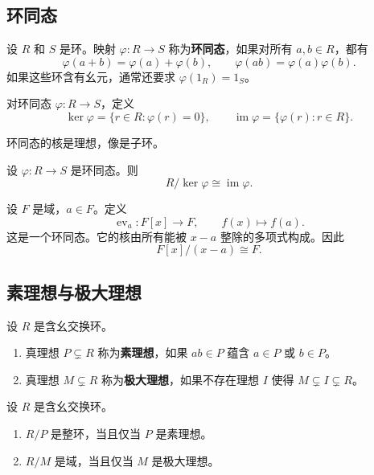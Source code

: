\subsection{环同态}

\begin{definition}[环同态]
设 $R$ 和 $S$ 是环。映射 $\varphi:R\to S$ 称为\textbf{环同态}，如果对所有 $a,b\in R$，都有
\[
    \varphi(a+b)=\varphi(a)+\varphi(b),
    \qquad
    \varphi(ab)=\varphi(a)\varphi(b).
\]
如果这些环含有幺元，通常还要求 $\varphi(1_R)=1_S$。
\end{definition}

\begin{definition}[核与像]
对环同态 $\varphi:R\to S$，定义
\[
    \ker\varphi=\{r\in R:\varphi(r)=0\},
    \qquad
    \operatorname{im}\varphi=\{\varphi(r):r\in R\}.
\]
\end{definition}

\begin{proposition}
环同态的核是理想，像是子环。
\end{proposition}

\begin{theorem}[环第一同构定理]
设 $\varphi:R\to S$ 是环同态。则
\[
    R/\ker\varphi\cong \operatorname{im}\varphi.
\]
\end{theorem}

\begin{example}[赋值同态]
设 $F$ 是域，$a\in F$。定义
\[
    \operatorname{ev}_a:F[x]\to F,
    \qquad
    f(x)\mapsto f(a).
\]
这是一个环同态。它的核由所有能被 $x-a$ 整除的多项式构成。因此
\[
    F[x]/(x-a)\cong F.
\]
\end{example}

\subsection{素理想与极大理想}

\begin{definition}[素理想与极大理想]
设 $R$ 是含幺交换环。
\begin{enumerate}
    \item 真理想 $P\subsetneq R$ 称为\textbf{素理想}，如果 $ab\in P$ 蕴含 $a\in P$ 或 $b\in P$。
    \item 真理想 $M\subsetneq R$ 称为\textbf{极大理想}，如果不存在理想 $I$ 使得 $M\subsetneq I\subsetneq R$。
\end{enumerate}
\end{definition}

\begin{theorem}[关于素理想和极大理想的商]
设 $R$ 是含幺交换环。
\begin{enumerate}
    \item $R/P$ 是整环，当且仅当 $P$ 是素理想。
    \item $R/M$ 是域，当且仅当 $M$ 是极大理想。
\end{enumerate}
\end{theorem}

